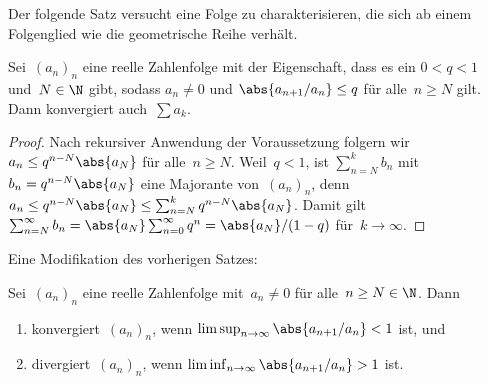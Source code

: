 \documentclass[a4paper]{article}
\begin{document}
Der folgende Satz versucht eine Folge zu charakterisieren, die sich ab einem Folgenglied wie die geometrische Reihe verhält.

\begin{theorem}[Quotientenkriterium]
    Sei~$(a_n)_n$ eine reelle Zahlenfolge mit der Eigenschaft, dass es ein $0 < q < 1$ und~$N \in \N$ gibt, sodass $a_n \neq 0$ und $\abs{a_{n+1} / a_n} \leq q$ für alle~$n \geq N$ gilt. Dann konvergiert auch~$\sum a_k$.
\end{theorem}

\begin{proof}
    Nach rekursiver Anwendung der Voraussetzung folgern wir $a_n \leq q^{n-N} \abs{a_N}$ für alle~$n \geq N$. Weil~$q < 1$, ist $\sum_{n=N}^k b_n$ mit~$b_n = q^{n-N} \abs{a_N}$ eine Majorante von~$(a_n)_n$, denn $a_n \leq q^{n-N} \abs{a_N} \leq \sum_{n=N}^k q^{n-N} \abs{a_N}$. Damit gilt $\sum_{n=N}^\infty b_n = \abs{a_N} \sum_{n=0}^\infty q^n = \abs{a_N} / (1-q)$ für~$k \to \infty$.
\end{proof}

Eine Modifikation des vorherigen Satzes:

\begin{corollary}
    Sei~$(a_n)_n$ eine reelle Zahlenfolge mit~$a_n \neq 0$ für alle~$n \geq N \in \N$. Dann
    \begin{enumerate}
        \item konvergiert~$(a_n)_n$, wenn $\limsup_{n\to\infty} \abs{a_{n+1}/a_n} < 1$ ist, und
        \item divergiert~$(a_n)_n$, wenn $\liminf_{n\to\infty} \abs{a_{n+1}/a_n} > 1$ ist.
    \end{enumerate}
\end{corollary}
\end{document}
